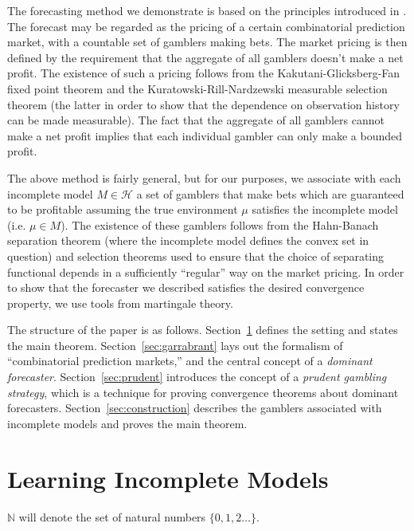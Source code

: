 \documentclass[11pt]{article}
\theoremstyle{definition}
\theoremstyle{plain}
\newcommand{\Nats}{\mathbb{N}}
\newcommand{\MC}{\mathcal{H}}
\begin{document}
The forecasting method we demonstrate is based on the principles introduced in \cite{Garrabrant_2016}. The forecast may be regarded as the pricing of a certain combinatorial prediction market, with a countable set of gamblers making bets. The market pricing is then defined by the requirement that the aggregate of all gamblers doesn't make a net profit. The existence of such a pricing follows from the Kakutani-Glicksberg-Fan fixed point theorem and the Kuratowski-Rill-Nardzewski measurable selection theorem (the latter in order to show that the dependence on observation history can be made measurable). The fact that the aggregate of all gamblers cannot make a net profit implies that each individual gambler can only make a bounded profit.

The above method is fairly general, but for our purposes, we associate with each incomplete model $M \in \MC$ a set of gamblers that make bets which are guaranteed to be profitable assuming the true environment $\mu$ satisfies the incomplete model (i.e. $\mu \in M$). The existence of these gamblers follows from the Hahn-Banach separation theorem (where the incomplete model defines the convex set in question) and selection theorems used to ensure that the choice of separating functional depends in a sufficiently \enquote{regular} way on the market pricing. In order to show that the forecaster we described satisfies the desired convergence property, we use tools from martingale theory.

The structure of the paper is as follows. Section~\ref{sec:learning} defines the setting and states the main theorem. Section~\ref{sec:garrabrant} lays out the formalism of \enquote{combinatorial prediction markets,} and the central concept of a \emph{dominant forecaster}. Section~\ref{sec:prudent} introduces the concept of a \emph{prudent gambling strategy}, which is a technique for proving convergence theorems about dominant forecasters. Section~\ref{sec:construction} describes the gamblers associated with incomplete models and proves the main theorem.

\section{Learning Incomplete Models}
\label{sec:learning}

$\Nats$ will denote the set of natural numbers $\{0, 1, 2 \ldots\}$.
\end{document}
